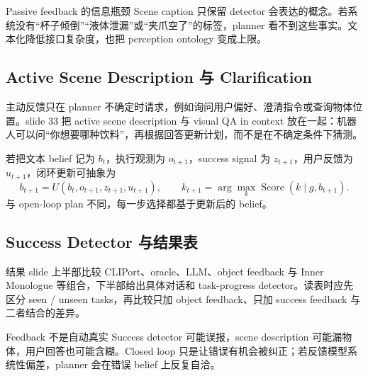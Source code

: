 
\begin{knowledgebox}{Passive feedback 的信息瓶颈}
Scene caption 只保留 detector 会表达的概念。若系统没有“杯子倾倒”“液体泄漏”或“夹爪空了”的标签，planner 看不到这些事实。文本化降低接口复杂度，也把 perception ontology 变成上限。
\end{knowledgebox}

\subsection{Active Scene Description 与 Clarification}

主动反馈只在 planner 不确定时请求，例如询问用户偏好、澄清指令或查询物体位置。slide 33 把 active scene description 与 visual QA in context 放在一起：机器人可以问“你想要哪种饮料”，再根据回答更新计划，而不是在不确定条件下猜测。


若把文本 belief 记为 $b_t$，执行观测为 $o_{t+1}$，success signal 为 $z_{t+1}$，用户反馈为 $u_{t+1}$，闭环更新可抽象为
\begin{equation}
b_{t+1}=U(b_t,o_{t+1},z_{t+1},u_{t+1}),
\qquad
k_{t+1}=\arg\max_k \operatorname{Score}(k\mid g,b_{t+1}).
\end{equation}
与 open-loop plan 不同，每一步选择都基于更新后的 belief。

\subsection{Success Detector 与结果表}

结果 slide 上半部比较 CLIPort、oracle、LLM、object feedback 与 Inner Monologue 等组合，下半部给出具体对话和 task-progress detector。读表时应先区分 seen / unseen tasks，再比较只加 object feedback、只加 success feedback 与二者结合的差异。


\begin{warningbox}{Feedback 不是自动真实}
Success detector 可能误报，scene description 可能漏物体，用户回答也可能含糊。Closed loop 只是让错误有机会被纠正；若反馈模型系统性偏差，planner 会在错误 belief 上反复自洽。
\end{warningbox}

